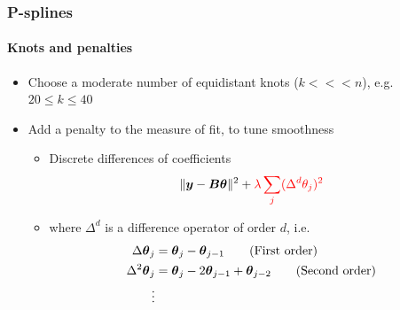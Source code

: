 \documentclass[11pt]{beamer}
\newcommand{\bfy}{\mbox{\boldmath $y$}}
\newcommand{\bfB}{\mbox{\boldmath $B$}}
\newcommand{\bftheta}{\mbox{\boldmath $\theta$}}
\begin{document}
\begin{frame}
\frametitle{P-splines}
\framesubtitle{Knots and penalties}
 \footnotesize
 
 \begin{itemize}

 \item Choose a moderate number of equidistant knots ($k <<< n$), e.g. $20\leq k\leq 40$

 \item Add a penalty to the measure of fit, to tune smoothness 

 \begin{itemize}

 \item \footnotesize{Discrete differences of coefficients}
 \[
 \| \bfy - \bfB \bftheta \|^2 + {\color{red}\lambda \sum_j(\Delta^d \theta_j)^2}
 \]

\item[]\quad where $\Delta^d$ is a difference operator of order $d$, i.e.
\begin{align*}
 \Delta \bftheta_j &= \bftheta_{j} - \bftheta_{j-1} \tag{First order} \\
 \Delta^2 \bftheta_j &= \bftheta_{j} - 2 \bftheta_{j-1} + \bftheta_{j-2}  \tag{Second order} \\
 \vdots
\end{align*}
\end{itemize}
 \end{itemize}
 
 
\end{frame}
%
\end{document}
